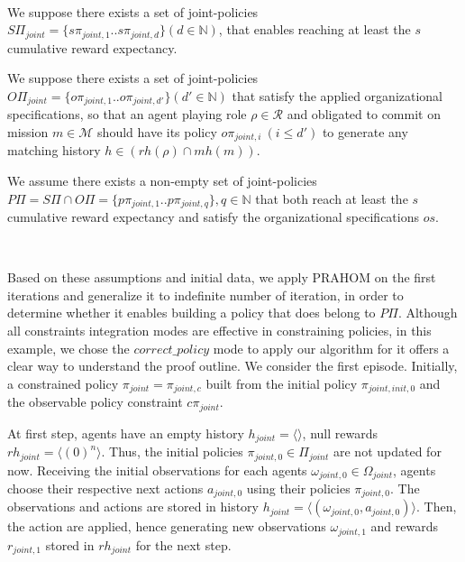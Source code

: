 \begin{proofoutline}
    \

    \noindent We suppose there exists a set of joint-policies $S\Pi_{joint} = \{s\pi_{joint,1}.. s\pi_{joint,d}\} \allowbreak (d \in \mathbb{N})$, that enables reaching at least the $s$ cumulative reward expectancy.

    \noindent We suppose there exists a set of joint-policies $O\Pi_{joint} = \{o\pi_{joint,1}.. o\pi_{joint,d'}\} (d' \in \mathbb{N})$ that satisfy the applied organizational specifications, so that an agent playing role $\rho \in \mathcal{R}$ and obligated to commit on mission $m \in \mathcal{M}$ should have its policy $o\pi_{joint,i} \ (i \leq d')$ to generate any matching history $h \in (rh(\rho) \cap mh(m))$.

    \noindent We assume there exists a non-empty set of joint-policies $P\Pi = S\Pi \cap O\Pi \allowbreak = \{p\pi_{joint,1}..p\pi_{joint,q}\}, q \in \mathbb{N}$ that both reach at least the $s$ cumulative reward expectancy and satisfy the organizational specifications $os$.

    \

    Based on these assumptions and initial data, we apply PRAHOM on the first iterations and generalize it to indefinite number of iteration, in order to determine whether it enables building a policy that does belong to $P\Pi$. Although all constraints integration modes are effective in constraining policies, in this example, we chose the $correct\_policy$ mode to apply our algorithm for it offers a clear way to understand the proof outline.
    We consider the first episode. Initially, a constrained policy $\pi_{joint} = \pi_{joint,c}$ built from the initial policy $\pi_{joint,init,0}$ and the observable policy constraint $c\pi_{joint}$.

    At first step, agents have an empty history $h_{joint} = \langle \rangle$, null rewards $rh_{joint} = \langle (0)^n \rangle $. Thus, the initial policies $\pi_{joint,0} \in \Pi_{joint}$ are not updated for now. Receiving the initial observations for each agents $\omega_{joint,0} \in \Omega_{joint}$, agents choose their respective next actions $a_{joint,0}$ using their policies $\allowbreak \pi_{joint,0}$. The observations and actions are stored in history $h_{joint} \allowbreak = \allowbreak \langle \allowbreak (\omega_{joint,0}, \allowbreak a_{joint,0}) \rangle$. Then, the action are applied, hence generating new observations $\omega_{joint,1}$ and rewards $r_{joint,1}$ stored in $rh_{joint}$ for the next step.



\end{proofoutline}

